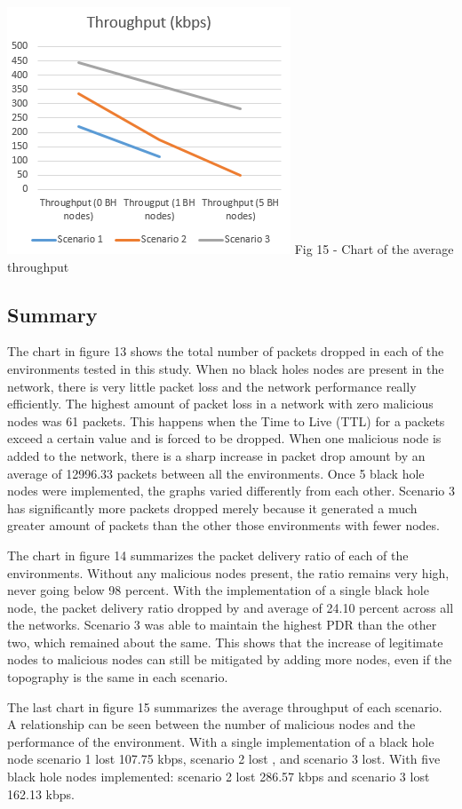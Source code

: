 \documentclass[conference,12pt]{IEEEtran}
\begin{document}
\includegraphics{TPChart}
\linebreak 
Fig 15 - Chart of the average throughput

\subsection{Summary}
The chart in figure 13 shows the total number of packets dropped in each of the environments tested in this study. When no black holes nodes are present in the network, there is very little packet loss and the network performance really efficiently. The highest amount of packet loss in a network with zero malicious nodes was 61 packets. This happens when the Time to Live (TTL) for a packets exceed a certain value and is forced to be dropped. When one malicious node is added to the network, there is a sharp increase in packet drop amount by an average of 12996.33 packets between all the environments. Once 5 black hole nodes were implemented, the graphs varied differently from each other. Scenario 3 has significantly more packets dropped merely because it generated a much greater amount of packets than the other those environments with fewer nodes. 

The chart in figure 14 summarizes the packet delivery ratio of each of the environments. Without any malicious nodes present, the ratio remains very high, never going below 98 percent. With the implementation of a single black hole node, the packet delivery ratio dropped by and average of 24.10 percent across all the networks. Scenario 3 was able to maintain the highest PDR than the other two, which remained about the same. This shows that the increase of legitimate nodes to malicious nodes can still be mitigated by adding more nodes, even if the topography is the same in each scenario. 

The last chart in figure 15 summarizes the average throughput of each scenario. A relationship can be seen between the number of malicious nodes and the performance of the environment. With a single implementation of a black hole node scenario 1 lost 107.75 kbps, scenario 2 lost , and scenario 3 lost. With five black hole nodes implemented: scenario 2 lost 286.57 kbps and scenario 3 lost 162.13 kbps.
\end{document}
